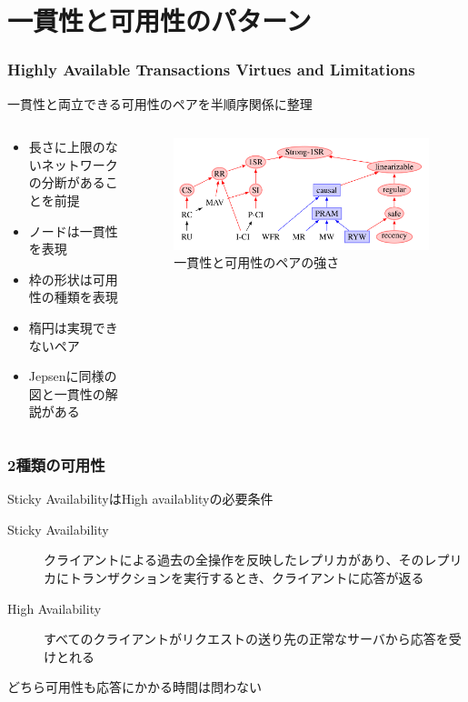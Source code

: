 \documentclass[unicode, 14pt, aspectratio=169]{beamer}
\begin{document}
\section{一貫性と可用性のパターン}
\begin{frame}
  \frametitle{\normalsize{Highly Available Transactions Virtues and Limitations\cite{high}}}
  {\large 一貫性と両立できる可用性のペアを半順序関係に整理}
  \begin{columns}
    \begin{column}{0.5\textwidth}
      \begin{itemize}
      \item {\small 長さに上限のないネットワークの分断があることを前提}
      \item {\small ノードは一貫性を表現}
      \item {\small 枠の形状は可用性の種類を表現}
      \item {\small 楕円は実現できないペア}        
      \item {\small Jepsenに同様の図と一貫性の解説がある\cite{jepsen-models}}
      \end{itemize}
    \end{column}    
    \begin{column}{0.5\textwidth}
      \begin{figure}
        \includegraphics[width=1\textwidth]{images/hat.png}
        \caption{一貫性と可用性のペアの強さ\cite{high}}
      \end{figure}
    \end{column} 
  \end{columns}
\end{frame}
\begin{frame}
  \frametitle{2種類の可用性}
  {\large Sticky AvailabilityはHigh availablityの必要条件}
  \begin{description}
  \item[Sticky Availability] クライアントによる過去の全操作を反映したレプリカがあり、そのレプリカにトランザクションを実行するとき、クライアントに応答が返る
  \item[High Availability] すべてのクライアントがリクエストの送り先の正常なサーバから応答を受けとれる
  \end{description}
  どちら可用性も応答にかかる時間は問わない
\end{frame}
\end{document}
